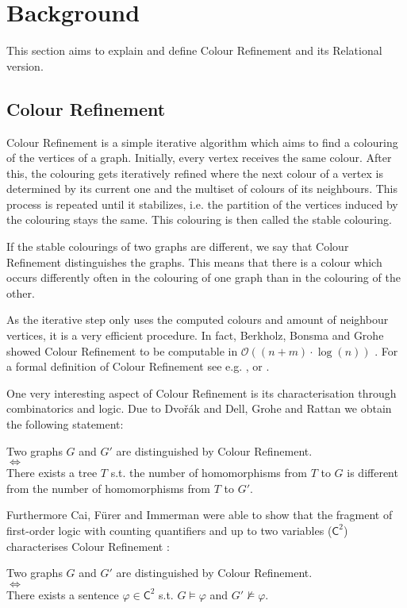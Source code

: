 \documentclass[a4paper,11pt,DIV=15]{scrartcl} %
\theoremstyle{plain}
\theoremstyle{definition}
\begin{document}
\section{Background}

This section aims to explain and define Colour Refinement and its Relational version.

\subsection{Colour Refinement} \label{sec::CR}

Colour Refinement is a simple iterative algorithm which aims to find a colouring of the vertices of a graph.
Initially, every vertex receives the same colour. 
After this, the colouring gets iteratively refined where the next colour of a vertex is determined by its current one and the multiset of colours of its neighbours.
This process is repeated until it stabilizes, i.e. the partition of the vertices induced by the colouring stays the same. This colouring is then called the stable colouring.

If the stable colourings of two graphs are different, we say that Colour Refinement distinguishes the graphs.
This means that there is a colour which occurs differently often in the colouring of one graph than in the colouring of the other.

As the iterative step only uses the computed colours and amount of neighbour vertices, it is a very efficient procedure.
In fact, Berkholz, Bonsma and Grohe showed Colour Refinement to be computable in $\mathcal O((n+m)\cdot\log (n))$ \cite{berkholz2017TightLower}.
For a formal definition of Colour Refinement see e.g. \cite{kiefer2020power}, \cite{scheidt2024color} or \cite{grohe2021color}.

One very interesting aspect of Colour Refinement is its characterisation through combinatorics and logic.
Due to Dvo\v r\'ak \cite{dvovrak2010recognizing} and Dell, Grohe and Rattan \cite{dell2018LovaszMeets} we obtain the following statement:
\begin{center}
	Two graphs $G$ and $G'$ are distinguished by Colour Refinement.
	\\ $\Longleftrightarrow$ \\ 
	There exists a tree $T$ s.t. the number of homomorphisms from $T$ to $G$ is different from the number of homomorphisms from $T$ to $G'$.
\end{center}
Furthermore Cai, Fürer and Immerman were able to show that the fragment of first-order logic with counting quantifiers and up to two variables ($\mathsf C^2$) characterises Colour Refinement \cite{cai1992optimal}:
\begin{center}
	Two graphs $G$ and $G'$ are distinguished by Colour Refinement.
	\\ $\Longleftrightarrow$ \\ 
	There exists a sentence $\varphi\in \mathsf C^2$ s.t. $G\models \varphi$ and $G'\not\models\varphi$.
\end{center}
\end{document}
